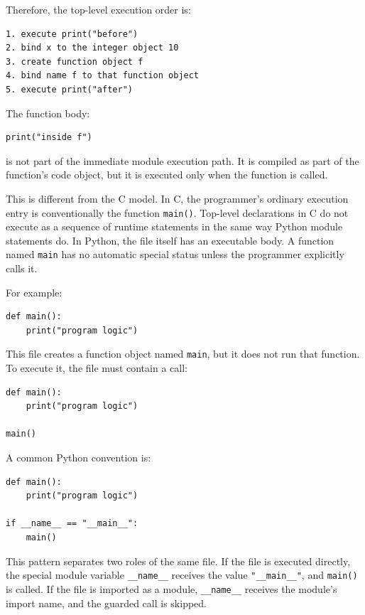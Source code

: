 Therefore, the top-level execution order is:

\begin{verbatim}
1. execute print("before")
2. bind x to the integer object 10
3. create function object f
4. bind name f to that function object
5. execute print("after")
\end{verbatim}

The function body:

\begin{verbatim}
print("inside f")
\end{verbatim}

is not part of the immediate module execution path. It is compiled as part of the function's code object, but it is executed only when the function is called.

This is different from the C model. In C, the programmer's ordinary execution entry is conventionally the function \texttt{main()}. Top-level declarations in C do not execute as a sequence of runtime statements in the same way Python module statements do. In Python, the file itself has an executable body. A function named \texttt{main} has no automatic special status unless the programmer explicitly calls it.

For example:

\begin{verbatim}
def main():
    print("program logic")
\end{verbatim}

This file creates a function object named \texttt{main}, but it does not run that function. To execute it, the file must contain a call:

\begin{verbatim}
def main():
    print("program logic")

main()
\end{verbatim}

A common Python convention is:

\begin{verbatim}
def main():
    print("program logic")

if __name__ == "__main__":
    main()
\end{verbatim}

This pattern separates two roles of the same file. If the file is executed directly, the special module variable \texttt{\_\_name\_\_} receives the value \texttt{"\_\_main\_\_"}, and \texttt{main()} is called. If the file is imported as a module, \texttt{\_\_name\_\_} receives the module's import name, and the guarded call is skipped.

